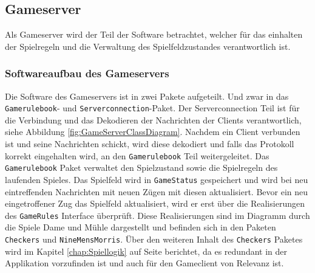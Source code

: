 \documentclass[12pt,a4paper,bibliography=totocnumbered,listof=totocnumbered]{article}
\begin{document}
\subsection{Gameserver}
Als Gameserver wird der Teil der Software betrachtet, welcher für das einhalten der Spielregeln und die Verwaltung des Spielfeldzustandes 
verantwortlich ist. 

\subsubsection{Softwareaufbau des Gameservers}
Die Software des Gameservers ist in zwei Pakete aufgeteilt. Und zwar in das \texttt{Gamerulebook}- und \texttt{Serverconnection}-Paket.
Der Serverconnection Teil ist für die Verbindung und das Dekodieren der Nachrichten der Clients verantwortlich, siehe Abbildung \ref{fig:GameServerClassDiagram}.
Nachdem ein Client verbunden ist und seine Nachrichten schickt, wird diese dekodiert und falls das Protokoll korrekt eingehalten wird,
an den \texttt{Gamerulebook} Teil weitergeleitet. Das \texttt{Gamerulebook} Paket verwaltet den Spielzustand sowie die Spielregeln des laufenden Spieles.
Das Spielfeld wird in \texttt{GameStatus} gespeichert und wird bei neu eintreffenden Nachrichten mit neuen Zügen mit diesen aktualisiert.
Bevor ein neu eingetroffener Zug das Spielfeld aktualisiert, wird er erst über die Realisierungen des \texttt{GameRules} Interface überprüft.
Diese Realisierungen sind im Diagramm durch die Spiele Dame und Mühle dargestellt und befinden sich in den Paketen \texttt{Checkers} und \texttt{NineMensMorris}.
Über den weiteren Inhalt des \texttt{Checkers} Paketes wird im Kapitel \ref{chap:Spiellogik} auf Seite \pageref{chap:Spiellogik} berichtet, da es 
redundant in der Applikation vorzufinden ist und auch für den Gameclient von Relevanz ist.
\end{document}
